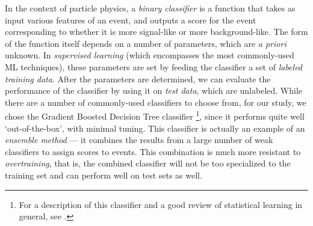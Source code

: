 In the context of particle physics, a \emph{binary classifier} is a function that takes as input various features of an event, and outputs a score for the event corresponding to whether it is more signal-like or more background-like. The form of the function itself depends on a number of parameters, which are \emph{a priori} unknown. In \emph{supervised learning} (which encompasses the most commonly-used ML techniques), these parameters are set by feeding the classifier a set of \emph{labeled training data}. After the parameters are determined, we can evaluate the performance of the classifier by using it on \emph{test data}, which are unlabeled. While there are a number of commonly-used classifiers to choose from, for our study, we chose the Gradient Boosted Decision Tree classifier \footnote{For a description of this classifier and a good review of statistical learning in general, see \citep{Hastie2011}.}, since it performs quite well `out-of-the-box', with minimal tuning. This classifier is actually an example of an \emph{ensemble method} --- it combines the results from a large number of weak classifiers to assign scores to events. This combination is much more resistant to \emph{overtraining}, that is, the combined classifier will not be too specialized to the training set and can perform well on test sets as well.
